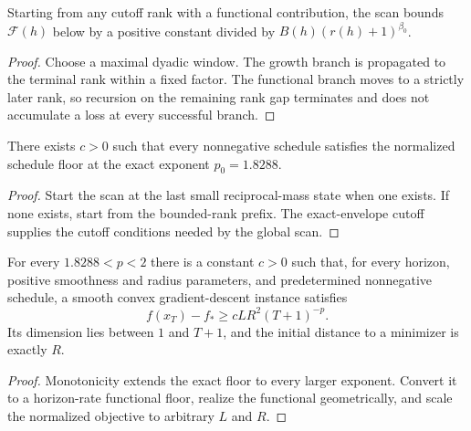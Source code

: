\begin{theorem}
  \label{thm:global-scan}
  \leanok
  Starting from any cutoff rank with a functional contribution, the scan
  bounds $\mathcal F(h)$ below by a positive constant divided by
  $B(h)(r(h)+1)^{\beta_0}$.
\end{theorem}

\begin{proof}
  \leanok
  Choose a maximal dyadic window.  The growth branch is propagated to the
  terminal rank within a fixed factor.  The functional branch moves to a
  strictly later rank, so recursion on the remaining rank gap terminates and
  does not accumulate a loss at every successful branch.
\end{proof}

\begin{theorem}
  \label{thm:sharper-floor}
  \leanok
  There exists $c>0$ such that every nonnegative schedule satisfies the
  normalized schedule floor at the exact exponent $p_0=1.8288$.
\end{theorem}

\begin{proof}
  \leanok
  Start the scan at the last small reciprocal-mass state when one exists.  If
  none exists, start from the bounded-rank prefix.  The exact-envelope cutoff
  supplies the cutoff conditions needed by the global scan.
\end{proof}

\begin{theorem}
  \label{thm:sharper-main}
  \leanok
  For every $1.8288<p<2$ there is a constant $c>0$ such that, for every
  horizon, positive smoothness and radius parameters, and predetermined
  nonnegative schedule, a smooth convex gradient-descent instance satisfies
  \[
    f(x_T)-f_*\geq cLR^2(T+1)^{-p}.
  \]
  Its dimension lies between $1$ and $T+1$, and the initial distance to a
  minimizer is exactly $R$.
\end{theorem}

\begin{proof}
  \leanok
  Monotonicity extends the exact floor to every larger exponent.  Convert it
  to a horizon-rate functional floor, realize the functional geometrically,
  and scale the normalized objective to arbitrary $L$ and $R$.
\end{proof}

